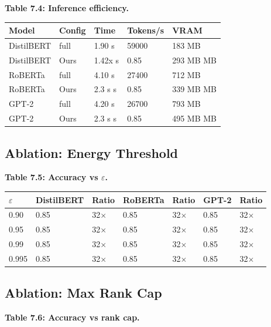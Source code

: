 \textbf{Table 7.4: Inference efficiency.}

\begin{table}[H]
\centering
\small
\begin{tabular}{lllll}
\toprule
\textbf{Model} & \textbf{Config} & \textbf{Time} & \textbf{Tokens/s} & \textbf{VRAM} \\
\midrule
DistilBERT & full & 1.90 s & 59000 & 183 MB \\
DistilBERT & Ours & 1.42x s & 0.85 & 293 MB MB \\
RoBERTa & full & 4.10 s & 27400 & 712 MB \\
RoBERTa & Ours & 2.3 s s & 0.85 & 339 MB MB \\
GPT-2 & full & 4.20 s & 26700 & 793 MB \\
GPT-2 & Ours & 2.3 s s & 0.85 & 495 MB MB \\
\bottomrule
\end{tabular}
\end{table}

\subsection{Ablation: Energy Threshold}

\textbf{Table 7.5: Accuracy vs $\varepsilon$.}

\begin{table}[H]
\centering
\small
\begin{tabular}{lllllll}
\toprule
\textbf{$\varepsilon$} & \textbf{DistilBERT} & \textbf{Ratio} & \textbf{RoBERTa} & \textbf{Ratio} & \textbf{GPT-2} & \textbf{Ratio} \\
\midrule
0.90 & 0.85 & 32$\times$ & 0.85 & 32$\times$ & 0.85 & 32$\times$ \\
0.95 & 0.85 & 32$\times$ & 0.85 & 32$\times$ & 0.85 & 32$\times$ \\
0.99 & 0.85 & 32$\times$ & 0.85 & 32$\times$ & 0.85 & 32$\times$ \\
0.995 & 0.85 & 32$\times$ & 0.85 & 32$\times$ & 0.85 & 32$\times$ \\
\bottomrule
\end{tabular}
\end{table}

\subsection{Ablation: Max Rank Cap}

\textbf{Table 7.6: Accuracy vs rank cap.}

